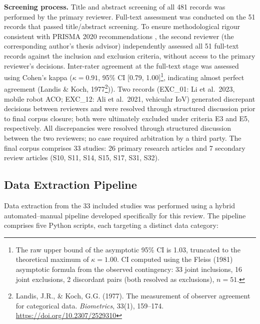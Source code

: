 \documentclass[review,3p,times]{elsarticle}
\begin{document}
\textbf{Screening process.} Title and abstract screening of all 481 records was performed by the primary reviewer. Full-text assessment was conducted on the 51 records that passed title/abstract screening. To ensure methodological rigour consistent with PRISMA 2020 recommendations \cite{page2021}, the second reviewer (the corresponding author's thesis advisor) independently assessed all 51 full-text records against the inclusion and exclusion criteria, without access to the primary reviewer's decisions. Inter-rater agreement at the full-text stage was assessed using Cohen's kappa ($\kappa=0.91$, 95\% CI [0.79, 1.00]\footnote{The raw upper bound of the asymptotic 95\% CI is 1.03, truncated to the theoretical maximum of $\kappa=1.00$. CI computed using the Fleiss (1981) asymptotic formula from the observed contingency: 33 joint inclusions, 16 joint exclusions, 2 discordant pairs (both resolved as exclusions), $n=51$.}, indicating almost perfect agreement (Landis \& Koch, 1977\footnote{Landis, J.R., \& Koch, G.G. (1977). The measurement of observer agreement for categorical data. \textit{Biometrics}, 33(1), 159--174. \url{https://doi.org/10.2307/2529310}})). Two records (EXC\_01: Li et al.\ 2023, mobile robot ACO; EXC\_12: Ali et al.\ 2021, vehicular IoV) generated discrepant decisions between reviewers and were resolved through structured discussion prior to final corpus closure; both were ultimately excluded under criteria E3 and E5, respectively. All discrepancies were resolved through structured discussion between the two reviewers; no case required arbitration by a third party. The final corpus comprises 33 studies: 26 primary research articles and 7 secondary review articles (S10, S11, S14, S15, S17, S31, S32).

\subsection{Data Extraction Pipeline}

Data extraction from the 33 included studies was performed using a hybrid automated--manual pipeline developed specifically for this review. The pipeline comprises five Python scripts, each targeting a distinct data category:
\end{document}
